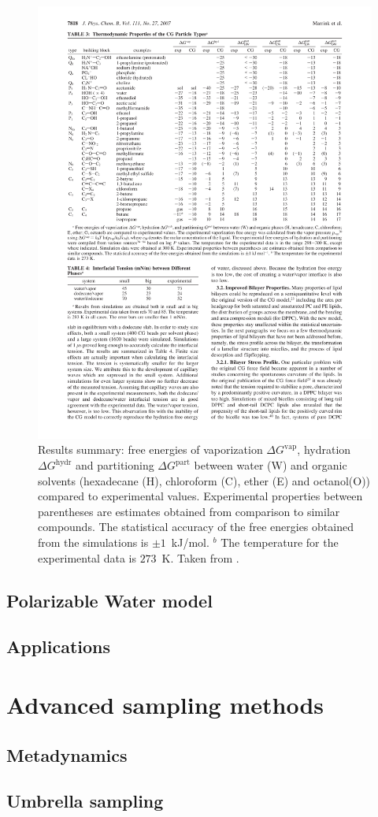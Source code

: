 \begin{figure}[!ht]
	\centering
	\includegraphics[width=\textwidth]{img/martiniTarget}
	\caption{Results summary: free energies of vaporization $\Delta G^\text{vap}$, hydration $\Delta G^\text{hydr}$ and partitioning $\Delta G^\text{part}$ between water (W) and organic solvents (hexadecane (H), chloroform (C), ether (E) and octanol(O)) compared to experimental values. Experimental properties between parentheses are estimates obtained from comparison to similar compounds. The statistical accuracy of the free energies obtained from the simulations is $\pm 1$~kJ/mol. $^b$ The temperature for the experimental data is $273$~K. Taken from \cite{Martini}.}
	\label{fig:martiniTarget}
\end{figure}

\subsection{Polarizable Water model}
\label{sec:pw}
\subsection{Applications}

\section{Advanced sampling methods}
	\subsection{Metadynamics}

	\subsection{Umbrella sampling} %


